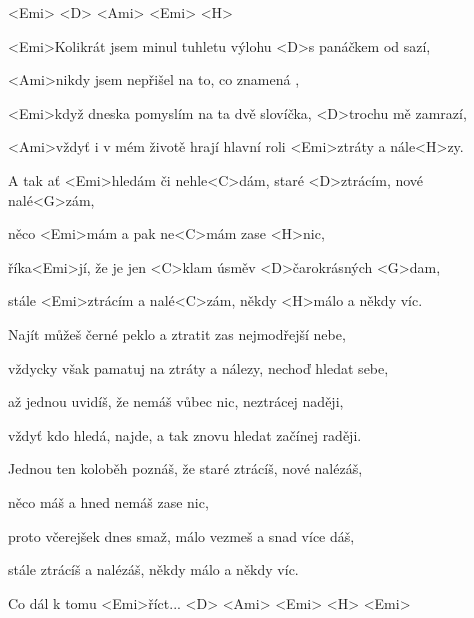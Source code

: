 

<Emi> <D> <Ami> <Emi> <H>

\zs
<Emi>Kolikrát jsem minul tuhletu výlohu <D>s panáčkem od sazí,

<Ami>nikdy jsem nepřišel na to, co znamená ,

<Emi>když dneska pomyslím na ta dvě slovíčka, <D>trochu mě zamrazí,

<Ami>vždyť i v mém životě hrají hlavní roli <Emi>ztráty a nále<H>zy.
\ks

\zr
A tak ať <Emi>hledám či nehle<C>dám, staré <D>ztrácím, nové nalé<G>zám,

něco <Emi>mám a pak ne<C>mám zase <H>nic,

říka<Emi>jí, že je jen <C>klam úsměv <D>čarokrásných <G>dam,

stále <Emi>ztrácím a nalé<C>zám, někdy <H>málo a někdy víc.
\kr

\zs
Najít můžeš černé peklo a ztratit zas nejmodřejší nebe,

vždycky však pamatuj na ztráty a nálezy, nechoď hledat sebe,

až jednou uvidíš, že nemáš vůbec nic, neztrácej naději,

vždyť kdo hledá, najde, a tak znovu hledat začínej raději.
\ks

\zr
Jednou ten koloběh poznáš, že staré ztrácíš, nové nalézáš,

něco máš a hned nemáš zase nic,

proto včerejšek dnes smaž, málo vezmeš a snad více dáš,

stále ztrácíš a nalézáš, někdy málo a někdy víc.
\kr

Co dál k tomu <Emi>říct... <D> <Ami> <Emi> <H> <Emi>

\kp
























